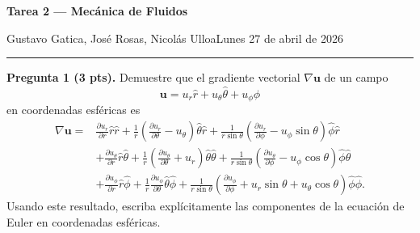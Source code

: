 \documentclass[12pt]{article}
\newcommand{\encabezado}[3]{%
{\Large\bfseries #1\par}\vspace{2pt}
{\normalsize #2\hfill #3\par}\vspace{6pt}\hrule\vspace{8pt}}
\begin{document}
\encabezado{Tarea 2 --- Mecánica de Fluidos}{Gustavo Gatica, José Rosas, Nicolás Ulloa}{Lunes 27 de abril de 2026}

\textbf{Pregunta 1 (3 pts).} Demuestre que el gradiente vectorial $\nabla\bm u$ de un campo
\[
\bm u=u_r\hat r+u_\theta\hat\theta+u_\phi\hat\phi
\]
en coordenadas esféricas es
\begin{align}
\nabla\bm u={}&
\frac{\partial u_r}{\partial r}\hat r\hat r
+\frac1r\left(\frac{\partial u_r}{\partial\theta}-u_\theta\right)\hat\theta\hat r
+\frac{1}{r\sin\theta}\left(\frac{\partial u_r}{\partial\phi}-u_\phi\sin\theta\right)\hat\phi\hat r\\
&+\frac{\partial u_\theta}{\partial r}\hat r\hat\theta
+\frac1r\left(\frac{\partial u_\theta}{\partial\theta}+u_r\right)\hat\theta\hat\theta
+\frac{1}{r\sin\theta}\left(\frac{\partial u_\theta}{\partial\phi}-u_\phi\cos\theta\right)\hat\phi\hat\theta\\
&+\frac{\partial u_\phi}{\partial r}\hat r\hat\phi
+\frac1r\frac{\partial u_\phi}{\partial\theta}\hat\theta\hat\phi
+\frac{1}{r\sin\theta}\left(\frac{\partial u_\phi}{\partial\phi}+u_r\sin\theta+u_\theta\cos\theta\right)\hat\phi\hat\phi.
\end{align}
Usando este resultado, escriba explícitamente las componentes de la ecuación de Euler en coordenadas esféricas.
\end{document}
